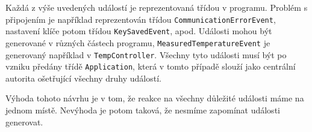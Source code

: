 Každá z výše uvedených událostí je reprezentovaná třídou v programu.
Problém s připojením je například reprezentován třídou \texttt{CommunicationErrorEvent}, nastavení
klíče potom třídou \texttt{KeySavedEvent}, apod.
Události mohou být generované v různých částech programu, \texttt{MeasuredTemperatureEvent} je generovaný
například v \texttt{TempController}.
Všechny tyto události musí být po vzniku předány třídě \texttt{Application}, která v tomto případě
slouží jako centrální autorita ošetřující všechny druhy událostí.

Výhoda tohoto návrhu je v tom, že reakce na všechny důležité události máme na jednom místě.
Nevýhoda je potom taková, že nesmíme zapomínat události generovat.
